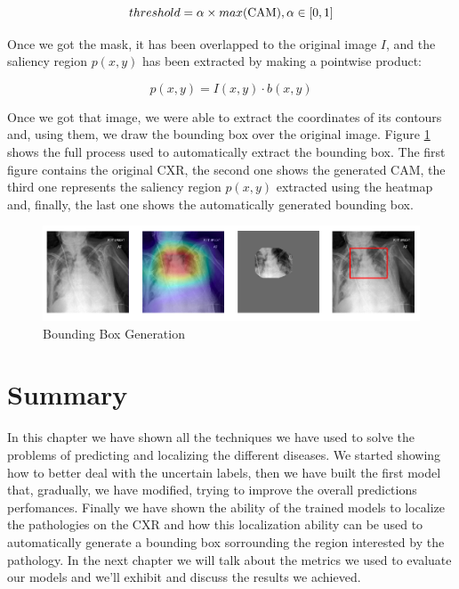 \begin{equation}
   threshold = \alpha \times max(\textup{CAM}), \alpha \in \left[0,1\right]
   \label{eq:threshold}
\end{equation}

Once we got the mask, it has been overlapped to the original image $I$, and the saliency region $p(x,y)$ has been extracted by making a pointwise product:

\begin{equation}
  p(x,y) = I(x,y) \cdot b(x,y)
   \label{eq:saliency_region}
\end{equation}

Once we got that image, we were able to extract the coordinates of its contours and, using them, we draw the bounding box over the original image. Figure \ref{fig:figure_4.5} shows the full process used to automatically extract the bounding box. The first figure contains the original \ac{CXR}, the second one shows the generated \ac{CAM}, the third one represents the saliency region $p(x,y)$ extracted using the heatmap and, finally, the last one shows the automatically generated bounding box.

\begin{figure}[htbp!]
\centering
\includegraphics[scale=0.43]{Tesi/images/bbox.png}
\caption{Bounding Box Generation}
\label{fig:figure_4.5}
\end{figure}

\section{Summary}
\label{sec:chapter_4_summary}
In this chapter we have shown all the techniques we have used to solve the problems of predicting and localizing the different diseases. We started showing how to better deal with the uncertain labels, then we have built the first model that, gradually, we have modified, trying to improve the overall predictions perfomances. Finally we have shown the ability of the trained models to localize the pathologies on the \ac{CXR} and how this localization ability can be used to automatically generate a bounding box sorrounding the region interested by the pathology. In the next chapter we will talk about the metrics we used to evaluate our models and we'll exhibit and discuss the results we achieved.